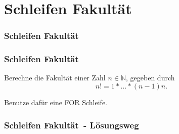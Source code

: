 \def\stitle{Schleifen Fakultät}
\section{\stitle}
\begin{frame}
  \frametitle{\stitle}%
\tableofcontents[current]
\end{frame}

\begin{frame}[t]%
    \frametitle{\stitle}

Berechne die Fakultät einer Zahl $n\in\mathbb{N}$, gegeben durch $$n!=1*\ldots*(n-1)n.$$

Benutze dafür eine FOR Schleife.
\pause

\end{frame}


\begin{frame}[fragile]%
 \frametitle{\stitle\ - L\"osungsweg}%

\end{frame}
